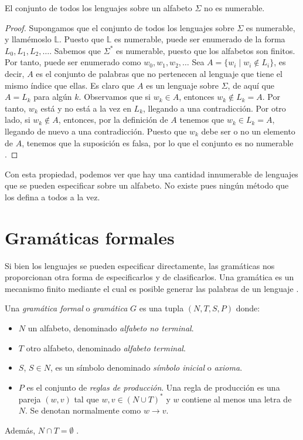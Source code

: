 \begin{teorema}El conjunto de todos los lenguajes sobre un alfabeto $\Sigma$ no es numerable.
\end{teorema}
\begin{proof}
Supongamos que el conjunto de todos los lenguajes sobre $\Sigma$ es numerable, y llamémoslo $\mathbb{L}$. Puesto que
$\mathbb{L}$ es numerable, puede ser enumerado de la forma $L_0,L_1,L_2,\dots$. Sabemos que $\Sigma^*$ es numerable,
puesto que los alfabetos son finitos. Por tanto, puede ser enumerado como $w_0,w_1,w_2,\dots$\newline
Sea $A=\{w_i\mid w_i\notin L_i\}$, es decir, $A$ es el conjunto de palabras que no pertenecen al lenguaje que tiene el 
mismo índice que ellas. Es claro que $A$ es un lenguaje sobre $\Sigma$, de aquí que $A=L_k$ para algún $k$. Observamos 
que si $w_k\in A$, entonces $w_k\notin L_k=A$. Por tanto, $w_k$ está y no está a la vez en $L_k$, llegando a una 
contradicción. Por otro lado, si $w_k\notin A$, entonces, por la definición de $A$ tenemos que $w_k\in L_k=A$,
llegando de nuevo a una contradicción.\newline
Puesto que $w_k$ debe ser o no un elemento de $A$, tenemos que la suposición es falsa, por lo que el conjunto es no
numerable \cite{kelley_2001}.
\end{proof}

Con esta propiedad, podemos ver que hay una cantidad innumerable de lenguajes que se pueden especificar sobre un
alfabeto. No existe pues ningún método que los defina a todos a la vez.

\section{Gramáticas formales}

Si bien los lenguajes se pueden especificar directamente, las gramáticas nos proporcionan otra forma de especificarlos
y de clasificarlos. Una gramática es un mecanismo finito mediante el cual es posible generar las palabras de un 
lenguaje \cite{Becerra2018}.

\begin{definicion} Una \textit{gramática formal} o \textit{gramática} $G$ es una tupla $(N,T,S,P)$
donde:
\begin{itemize}
    \item $N$ un alfabeto, denominado \textit{alfabeto no terminal}.
    \item $T$ otro alfabeto, denominado \textit{alfabeto terminal}.
    \item $S$, $S\in N$, es un símbolo denominado \textit{símbolo inicial} o \textit{axioma}.
    \item $P$ es el conjunto de \textit{reglas de producción}. Una regla de producción es una pareja $(w,v)$ tal que
    $w,v\in(N\cup T)^*$ y $w$ contiene al menos una letra de $N$. Se denotan normalmente como $w\to v$.
\end{itemize}
Además, $N\cap T=\emptyset$ \cite{Becerra2018}.
\end{definicion}

